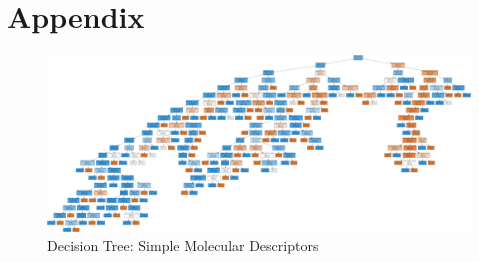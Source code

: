 \documentclass[a4paper,12pt]{report}
\begin{document}
\chapter*{Appendix}
\begin{figure}[H]
	\centering
	\includegraphics[width=\textwidth,scale=1,height=\textheight]{images/bbb_tree_smd}
	\caption{Decision Tree: Simple Molecular Descriptors}
	\label{fig:bbb_tree_smd_large}
\end{figure}




\end{document}

